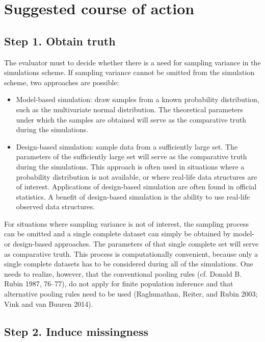 \documentclass[
]{article}
\providecommand{\tightlist}{%
  \setlength{\itemsep}{0pt}\setlength{\parskip}{0pt}}
\begin{document}
\hypertarget{suggested-course-of-action}{%
\section{Suggested course of action}\label{suggested-course-of-action}}

\hypertarget{step-1.-obtain-truth}{%
\subsection{Step 1. Obtain truth}\label{step-1.-obtain-truth}}

The evaluator must to decide whether there is a need for sampling
variance in the simulations scheme. If sampling variance cannot be
omitted from the simulation scheme, two approaches are possible:

\begin{itemize}
\tightlist
\item
  Model-based simulation: draw samples from a known probability
  distribution, such as the multivariate normal distribution. The
  theoretical parameters under which the samples are obtained will serve
  as the comparative truth during the simulations.
\item
  Design-based simulation: sample data from a sufficiently large set.
  The parameters of the sufficiently large set will serve as the
  comparative truth during the simulations. This approach is often used
  in situations where a probability distribution is not available, or
  where real-life data structures are of interest. Applications of
  design-based simulation are often found in official statistics. A
  benefit of design-based simulation is the ability to use real-life
  observed data structures.
\end{itemize}

For situations where sampling variance is not of interest, the sampling
process can be omitted and a single complete dataset can simply be
obtained by model- or design-based approaches. The parameters of that
single complete set will serve as comparative truth. This process is
computationally convenient, because only a single complete datasets has
to be considered during all of the simulations. One needs to realize,
however, that the conventional pooling rules (cf. Donald B. Rubin 1987,
76--77), do not apply for finite population inference and that
alternative pooling rules need to be used (Raghunathan, Reiter, and
Rubin 2003; Vink and van Buuren 2014).

\hypertarget{step-2.-induce-missingness}{%
\subsection{Step 2. Induce
missingness}\label{step-2.-induce-missingness}}
\end{document}
